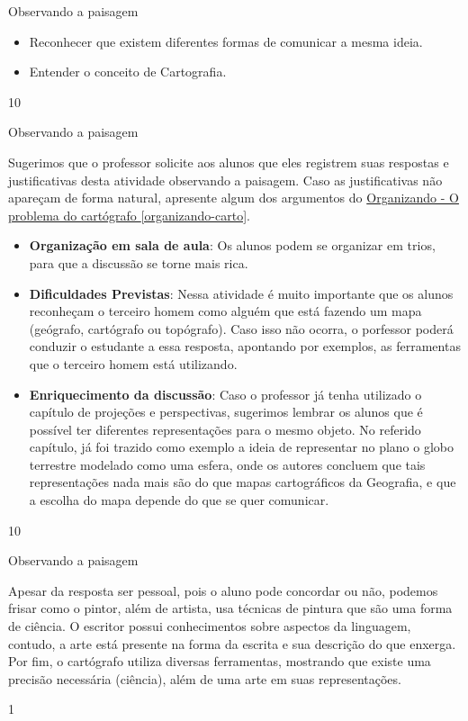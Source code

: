 \begin{objectives}{Observando a paisagem}
{
	\begin{itemize}
	\item Reconhecer que existem diferentes formas de comunicar a mesma ideia.
	\item Entender o conceito de Cartografia.
	\end{itemize}
}{1}{0}
\end{objectives}
\vspace{-.5em}
\begin{sugestions}{Observando a paisagem}
{
	Sugerimos que o professor solicite aos alunos que eles registrem suas respostas e justificativas desta atividade observando a paisagem. Caso as justificativas não apareçam de forma natural, apresente algum dos argumentos do  \hyperref[organizando-carto]{Organizando - O problema do cartógrafo \ref{organizando-carto}}.
	
	\begin{itemize}
	\item \textbf{Organização em sala de aula}: Os alunos podem se organizar em trios, para que a discussão se torne mais rica.
	
	\item \textbf{Dificuldades Previstas}: Nessa atividade é muito importante que os alunos reconheçam o terceiro homem como alguém que está fazendo um mapa (geógrafo, cartógrafo ou topógrafo). Caso isso não ocorra, o porfessor poderá conduzir o estudante a essa resposta, apontando por exemplos, as ferramentas que o terceiro homem está utilizando.
	
	\item \textbf{Enriquecimento da discussão}: Caso o professor já tenha utilizado o capítulo de projeções e perspectivas, sugerimos lembrar os alunos que é possível ter diferentes representações para o mesmo objeto. No referido capítulo, já foi trazido como exemplo a ideia de representar no plano o globo terrestre modelado como uma esfera, onde os autores concluem que tais representações nada mais são do que mapas cartográficos da Geografia, e que a escolha do mapa depende do que se quer comunicar.
	\end{itemize}
}{1}{0}
\end{sugestions}
\begin{answer}{Observando a paisagem}
{
	Apesar da resposta ser pessoal, pois o aluno pode concordar ou não, podemos frisar como o pintor, além de artista, usa técnicas de pintura que são uma forma de ciência. O escritor possui conhecimentos sobre aspectos da linguagem, contudo, a arte está presente na forma da escrita e sua descrição do que enxerga. Por fim, o cartógrafo utiliza diversas ferramentas, mostrando que existe uma precisão necessária (ciência), além de uma arte em suas representações.

}{1}
\end{answer}

